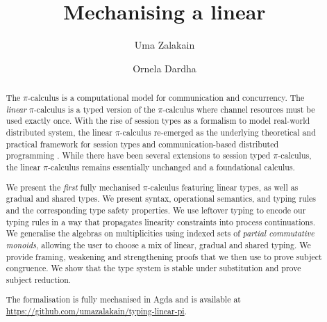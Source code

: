 \documentclass[a4paper,UKenglish,cleveref, autoref, thm-restate,authorcolumns]{lipics-v2019}
\title{Mechanising a linear \picalc}
\author{Uma Zalakain}{University of Glasgow, Scotland}
       {u.zalakain.1@research.gla.ac.uk}{https://orcid.org/0000-0002-3268-9338}{}
\author{Ornela Dardha}{University of Glasgow, Scotland}
       {ornela.dardha@glasgow.ac.uk}{https://orcid.org/0000-0001-9927-7875}{}
\theoremstyle{definition}
\newcommand{\picalc}{$\pi$-calculus}
\begin{document}
\maketitle

\begin{abstract}
  The \picalc{} is a computational model for communication and concurrency.
  The \emph{linear} \picalc{} is a typed version of the \picalc{} where channel resources must be used exactly once.
  With the rise of session types as a formalism to model real-world distributed system, the linear \picalc{} re-emerged as the underlying theoretical and practical framework for session types and communication-based distributed programming \cite{DardhaGS12,Padovani17,ScalasY16,ScalasDHY17}.
  While there have been several extensions to session typed \picalc{}, the linear \picalc{} remains essentially unchanged and a foundational calculus.

  We present the \emph{first} fully mechanised \picalc{} featuring linear types, as well as gradual and shared types.
  We present syntax, operational semantics, and typing rules and the corresponding type safety properties.
  We use leftover typing \cite{Allais2018a} to encode our typing rules in a way that propagates linearity constraints into process continuations.
  We generalise the algebras on multiplicities using indexed sets of \emph{partial commutative monoids}, allowing the user to choose a mix of linear, gradual and shared typing.
  We provide framing, weakening and strengthening proofs that we then use to prove subject congruence.
  We show that the type system is stable under substitution and prove subject reduction.

  The formalisation is fully mechanised in Agda and is available at \url{https://github.com/umazalakain/typing-linear-pi}.
\end{abstract}

\end{document}

